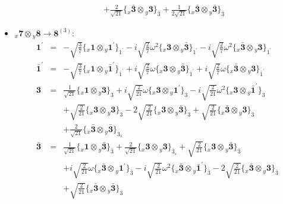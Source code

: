 \documentclass[english]{article}
\newcommand{\rep}[1]{\mathbf{#1}}
\newcommand{\repx}[2]{{}_{#2}\mathbf{#1}}
\newcommand{\subcg}[3]{\big\{ \repx{#1}{x}\otimes\repx{#2}{y}\big\}^{}_{#3}}
\begin{document}
\begin{itemize}
\begin{eqnarray*}
 & & +\frac{2}{\sqrt{21}}\subcg{\bar{3}}{3}{\bar{3}}+\frac{1}{2 \sqrt{21}}\subcg{\bar{3}}{\bar{3}}{\bar{3}}
\end{eqnarray*}
\item $\repx{7}{x}\otimes\repx{8}{y}\to\rep{8}^{(3)}$:
\begin{eqnarray*}
\rep{1^{\prime}} &=& -\sqrt{\frac{3}{7}}\subcg{1}{1^{\prime}}{1^{\prime}}-i \sqrt{\frac{2}{7}} \omega ^2\subcg{3}{\bar{3}}{1^{\prime}}-i \sqrt{\frac{2}{7}} \omega ^2\subcg{\bar{3}}{3}{1^{\prime}}
\\
\rep{\bar{1}^{\prime}} &=& -\sqrt{\frac{3}{7}}\subcg{1}{\bar{1}^{\prime}}{\bar{1}^{\prime}}+i \sqrt{\frac{2}{7}} \omega\subcg{3}{\bar{3}}{\bar{1}^{\prime}}+i \sqrt{\frac{2}{7}} \omega\subcg{\bar{3}}{3}{\bar{1}^{\prime}}
\\
\rep{3} &=& \frac{1}{\sqrt{21}}\subcg{1}{3}{3}+i \sqrt{\frac{2}{21}} \omega\subcg{3}{1^{\prime}}{3}-i \sqrt{\frac{2}{21}} \omega ^2\subcg{3}{\bar{1}^{\prime}}{3} \\ 
 & & +\sqrt{\frac{2}{21}}\subcg{3}{3}{3}-2 \sqrt{\frac{2}{21}}\subcg{3}{\bar{3}}{3}+\sqrt{\frac{2}{21}}\subcg{\bar{3}}{3}{3} \\ 
 & & +\frac{2}{\sqrt{21}}\subcg{\bar{3}}{\bar{3}}{3_{s}}
\\
\rep{\bar{3}} &=& \frac{1}{\sqrt{21}}\subcg{1}{\bar{3}}{\bar{3}}+\frac{2}{\sqrt{21}}\subcg{3}{3}{\bar{3}_{s}}+\sqrt{\frac{2}{21}}\subcg{3}{\bar{3}}{\bar{3}} \\ 
 & & +i \sqrt{\frac{2}{21}} \omega\subcg{\bar{3}}{1^{\prime}}{\bar{3}}-i \sqrt{\frac{2}{21}} \omega ^2\subcg{\bar{3}}{\bar{1}^{\prime}}{\bar{3}}-2 \sqrt{\frac{2}{21}}\subcg{\bar{3}}{3}{\bar{3}} \\ 
 & & +\sqrt{\frac{2}{21}}\subcg{\bar{3}}{\bar{3}}{\bar{3}}
\end{eqnarray*}
\end{itemize}
\end{document}

